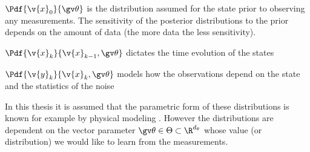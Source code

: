 \begin{description}
\addtolength{\leftskip}{1cm}
	\item[Prior distribution]
	$\Pdf{\v{x}_0}{\Th}$ is the distribution assumed for the state prior to observing any measurements. The
	sensitivity of the posterior distributions to the prior depends on the amount of data (the more data the less sensitivity).
	\item[Dynamic model]
	$\Pdf{\v{x}_k}{\v{x}_{k-1},\Th}$ dictates the time evolution of the states
	\item[Measurement model]
	$\Pdf{\v{y}_k}{\v{x}_{k},\Th}$ models how the observations depend on the state and the statistics of the noise
\end{description}
In this thesis it is assumed that the parametric form of these distributions is known
for example by physical modeling \parencite{ljung1994modeling}. However the distributions are dependent on
the vector parameter $\Th \in \Theta \subset \R^{d_\theta}$ whose value (or distribution) we would like to learn from
the measurements.


